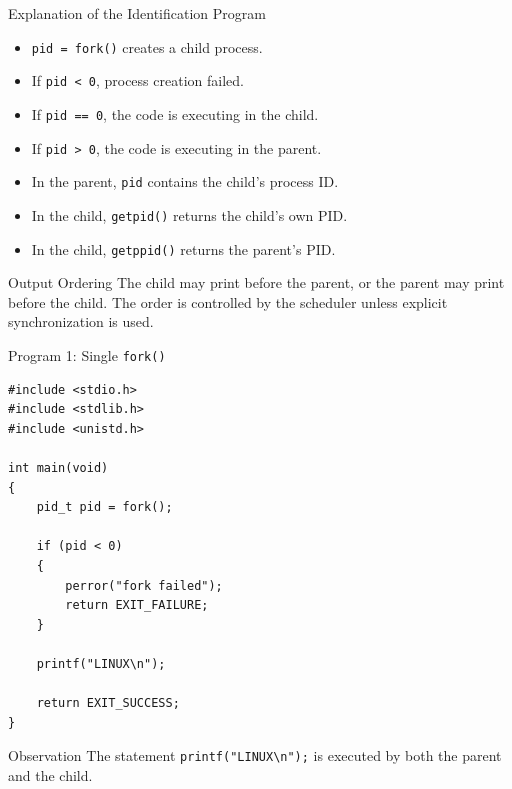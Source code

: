 \documentclass[aspectratio=169]{beamer}
\begin{document}
\begin{frame}{Explanation of the Identification Program}

\begin{itemize}
    \item \texttt{pid = fork()} creates a child process.
    \item If \texttt{pid < 0}, process creation failed.
    \item If \texttt{pid == 0}, the code is executing in the child.
    \item If \texttt{pid > 0}, the code is executing in the parent.
    \item In the parent, \texttt{pid} contains the child's process ID.
    \item In the child, \texttt{getpid()} returns the child's own PID.
    \item In the child, \texttt{getppid()} returns the parent's PID.
\end{itemize}

\begin{alertblock}{Output Ordering}
The child may print before the parent, or the parent may print before the child.
The order is controlled by the scheduler unless explicit synchronization is used.
\end{alertblock}

\end{frame}

\begin{frame}[fragile]{Program 1: Single \texttt{fork()}}

\begin{lstlisting}[style=cstyle]
#include <stdio.h>
#include <stdlib.h>
#include <unistd.h>

int main(void)
{
    pid_t pid = fork();

    if (pid < 0)
    {
        perror("fork failed");
        return EXIT_FAILURE;
    }

    printf("LINUX\n");

    return EXIT_SUCCESS;
}
\end{lstlisting}

\begin{block}{Observation}
The statement \texttt{printf("LINUX\textbackslash n");} is executed by both the
parent and the child.
\end{block}

\end{frame}
\end{document}
